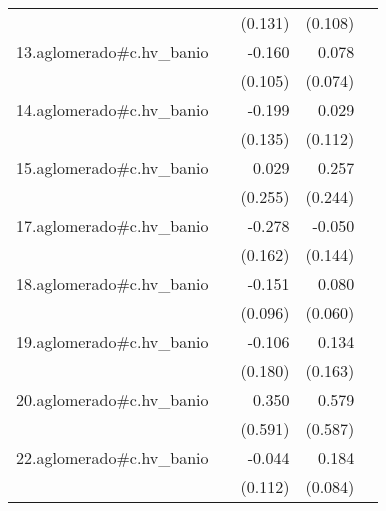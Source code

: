 {\begin{longtable}{l*{4}{D{.}{.}{-1}}}
            &                     &     (0.131)         &     (0.108)         &                     \\
\addlinespace
13.aglomerado#c.hv\_banio&                     &      -0.160         &       0.078         &                     \\
            &                     &     (0.105)         &     (0.074)         &                     \\
\addlinespace
14.aglomerado#c.hv\_banio&                     &      -0.199         &       0.029         &                     \\
            &                     &     (0.135)         &     (0.112)         &                     \\
\addlinespace
15.aglomerado#c.hv\_banio&                     &       0.029         &       0.257         &                     \\
            &                     &     (0.255)         &     (0.244)         &                     \\
\addlinespace
17.aglomerado#c.hv\_banio&                     &      -0.278         &      -0.050         &                     \\
            &                     &     (0.162)         &     (0.144)         &                     \\
\addlinespace
18.aglomerado#c.hv\_banio&                     &      -0.151         &       0.080         &                     \\
            &                     &     (0.096)         &     (0.060)         &                     \\
\addlinespace
19.aglomerado#c.hv\_banio&                     &      -0.106         &       0.134         &                     \\
            &                     &     (0.180)         &     (0.163)         &                     \\
\addlinespace
20.aglomerado#c.hv\_banio&                     &       0.350         &       0.579         &                     \\
            &                     &     (0.591)         &     (0.587)         &                     \\
\addlinespace
22.aglomerado#c.hv\_banio&                     &      -0.044         &       0.184\sym{*}  &                     \\
            &                     &     (0.112)         &     (0.084)         &                     \\

\end{longtable}}
